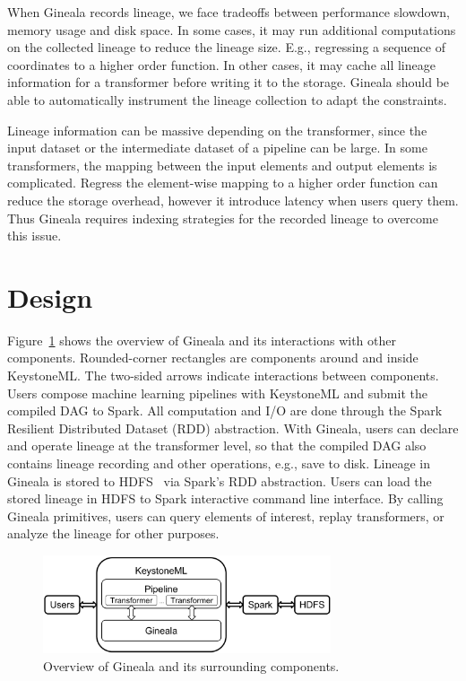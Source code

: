 \documentclass{sig-alternate}
\begin{document}
When Gineala records lineage, we face tradeoffs between performance slowdown, memory usage and disk space.
In some cases, it may run additional computations on the collected lineage to reduce the lineage size. 
E.g., regressing a sequence of coordinates to a higher order function. 
In other cases, it may cache all lineage information for a transformer before writing it to the storage. 
Gineala should be able to automatically instrument the lineage collection to adapt the constraints.

Lineage information can be massive depending on the transformer, since the input dataset or the intermediate dataset of a pipeline can be large.
In some transformers, the mapping between the input elements and output elements is complicated. 
Regress the element-wise mapping to a higher order function can reduce the storage overhead, however it introduce latency when users
query them. Thus Gineala requires indexing strategies for the recorded lineage to overcome this issue.

\section{Design}
\label{sec:Design}
Figure~\ref{fig:architecture} shows the overview of Gineala and its interactions with other components. 
Rounded-corner rectangles are components around and inside KeystoneML. 
The two-sided arrows indicate interactions between components.
Users compose machine learning pipelines with KeystoneML and submit the compiled DAG to Spark.
All computation and I/O are done through the Spark Resilient Distributed Dataset (RDD) abstraction.
With Gineala, users can declare and operate lineage at the transformer level, 
so that the compiled DAG also contains lineage recording and other operations, e.g., save to disk.
Lineage in Gineala is stored to HDFS~\cite{shvachko10} via Spark's RDD abstraction.
Users can load the stored lineage in HDFS to Spark interactive command line interface.
By calling Gineala primitives, users can query elements of interest, replay transformers, or analyze
the lineage for other purposes.

\begin{figure}[h]
\begin{center}
    \includegraphics[width=85mm]{pictures/architecture}
\caption {Overview of Gineala and its surrounding components.
    \label{fig:architecture}
}
\end{center}
\end{figure}
\end{document}
